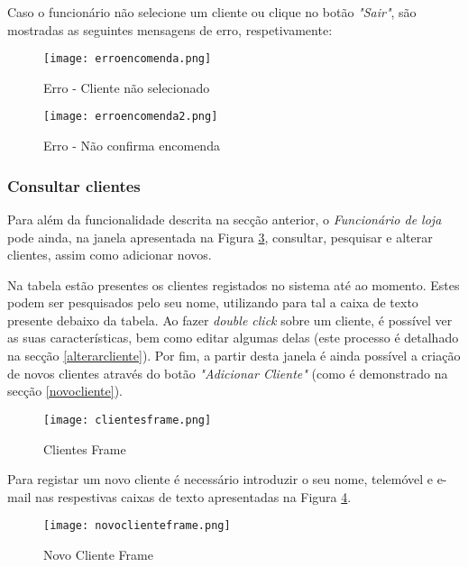 Caso o funcionário não selecione um cliente ou clique no botão \textit{"Sair"}, são mostradas as seguintes mensagens de erro, respetivamente:

\begin{figure}[H]
	\centering
	\texttt{[image: erroencomenda.png]}
	\caption{Erro - Cliente não selecionado}
	\label{erroencomenda}
\end{figure}

\begin{figure}[H]
	\centering
	\texttt{[image: erroencomenda2.png]}
	\caption{Erro - Não confirma encomenda}
	\label{erroencomenda2}
\end{figure}



\subsubsection{Consultar clientes}
Para além da funcionalidade descrita na secção anterior, o \textit{Funcionário de loja} pode ainda, na janela apresentada na Figura \ref{clientesframe}, consultar, pesquisar e alterar clientes, assim como adicionar novos. 

Na tabela estão presentes os clientes registados no sistema até ao momento. Estes podem ser pesquisados pelo seu nome, utilizando para tal a caixa de texto presente debaixo da tabela. Ao fazer \textit{double click} sobre um cliente, é possível ver as suas características, bem como editar algumas delas (este processo é detalhado na secção \ref{alterarcliente}). Por fim, a partir desta janela é ainda possível a criação de novos clientes através do botão \textit{"Adicionar Cliente"} (como é demonstrado na secção \ref{novocliente}).

\begin{figure}[H]
	\centering
	\texttt{[image: clientesframe.png]}
	\caption{Clientes Frame}
	\label{clientesframe}
\end{figure}


\label{novocliente} 

Para registar um novo cliente é necessário introduzir o seu nome, telemóvel e e-mail nas respestivas caixas de texto apresentadas na Figura \ref{novoclienteframe}.

\begin{figure}[H]
	\centering
	\texttt{[image: novoclienteframe.png]}
	\caption{Novo Cliente Frame}
	\label{novoclienteframe}
\end{figure}


